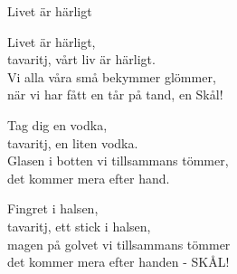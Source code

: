 \begin{song}{Livet är härligt}

	
	Livet är härligt,\\
	tavaritj, vårt liv är härligt.\\
	Vi alla våra små bekymmer glömmer,\\
	när vi har fått en tår på tand, en Skål!
	
	Tag dig en vodka,\\
	tavaritj, en liten vodka.\\
	Glasen i botten vi tillsammans tömmer,\\
	det kommer mera efter hand.
	
	Fingret i halsen,\\
	tavaritj, ett stick i halsen,\\
	magen på golvet vi tillsammans tömmer\\
	det kommer mera efter handen - SKÅL!
	
\end{song}
